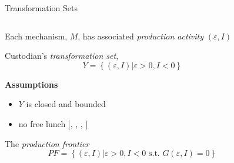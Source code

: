 \begin{frame}[allowframebreaks]{Transformation Sets}
\begin{columns}[T] %
\begin{column}{.58\textwidth}
	\begin{wideitemize}
	    \item Each mechanism, $M$, has associated \emph{production activity} $(\varepsilon,I)$
	    \item Custodian's \emph{transformation set},
	    $$Y=\left\{ \left( \varepsilon ,I \right) \left\vert \varepsilon >0,I<0 \right. \right\}$$
	    \item \textbf{Assumptions}
	    \begin{itemize}
	    	\item $Y$ is closed and bounded
	    	\item no free lunch [\citet{Dwork2004}, \citet{Dwork2008}, \citet{gehrke2011towards}, \citet{Kifer:2011:NFL:1989323.1989345}]
	    \end{itemize}
		\item The \emph{production frontier}
		$$
		PF=\left\{ \left( \varepsilon ,I\right)
		\left\vert \varepsilon >0,I<0\text{ s.t. }G(\varepsilon ,I)=0\right.
		\right\}
		$$
	\end{wideitemize}
\end{column}%
\hfill%
\begin{column}{.38\textwidth}
\end{column}%
\end{columns}
\end{frame}



